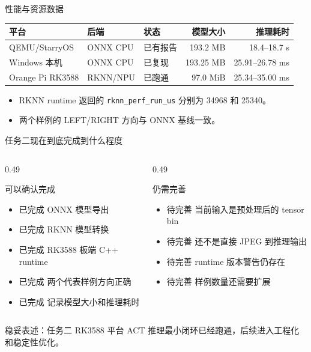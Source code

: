 \documentclass[aspectratio=169,11pt]{ctexbeamer}
\newcommand{\ok}{\textcolor{green!45!black}{已完成}}
\newcommand{\risk}{\textcolor{orange!80!black}{待完善}}
\newcommand{\code}[1]{\texttt{\small #1}}
\begin{document}
\begin{frame}{性能与资源数据}
  \begin{table}
    \centering
    \small
    \begin{tabularx}{\linewidth}{l l l r r}
      \toprule
      平台 & 后端 & 状态 & 模型大小 & 推理耗时 \\
      \midrule
      QEMU/StarryOS & ONNX CPU & 已有报告 & 193.2 MB & 18.4--18.7 s \\
      Windows 本机 & ONNX CPU & 已复现 & 193.25 MB & 25.91--26.78 ms \\
      Orange Pi RK3588 & RKNN/NPU & 已跑通 & 97.0 MiB & 25.34--35.00 ms \\
      \bottomrule
    \end{tabularx}
  \end{table}
  \begin{itemize}
    \item RKNN runtime 返回的 \code{rknn\_perf\_run\_us} 分别为 34968 和 25340。
    \item 两个样例的 LEFT/RIGHT 方向与 ONNX 基线一致。
  \end{itemize}
\end{frame}

\begin{frame}{任务二现在到底完成到什么程度}
  \begin{columns}[T,onlytextwidth]
    \begin{column}{0.49\textwidth}
      \begin{block}{可以确认完成}
        \begin{itemize}
          \item \ok{} ONNX 模型导出
          \item \ok{} RKNN 模型转换
          \item \ok{} RK3588 板端 C++ runtime
          \item \ok{} 两个代表样例方向正确
          \item \ok{} 记录模型大小和推理耗时
        \end{itemize}
      \end{block}
    \end{column}
    \begin{column}{0.49\textwidth}
      \begin{alertblock}{仍需完善}
        \begin{itemize}
          \item \risk{} 当前输入是预处理后的 tensor bin
          \item \risk{} 还不是直接 JPEG 到推理输出
          \item \risk{} runtime 版本警告仍存在
          \item \risk{} 样例数量还需要扩展
        \end{itemize}
      \end{alertblock}
    \end{column}
  \end{columns}
  \vspace{0.3em}
  \small 稳妥表述：任务二 RK3588 平台 ACT 推理最小闭环已经跑通，后续进入工程化和稳定性优化。
\end{frame}
\end{document}

